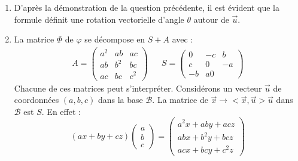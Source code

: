 \begin{enumerate}
\begin{multline*}
\overrightarrow u \wedge \overrightarrow x,
\overrightarrow u
\right) 
=
 \det
\left( 
\overrightarrow u \wedge \overrightarrow x,
\overrightarrow u,
(\overrightarrow u \wedge \overrightarrow x)\wedge \overrightarrow u
\right) \\
=
\left\Vert
(\overrightarrow u \wedge \overrightarrow x)\wedge \overrightarrow u
\right\Vert ^2
>0
\end{multline*}
On peut former une base orthonormée directe:
\begin{displaymath}
 \left( 
\dfrac{1}{\Vert \overrightarrow u \wedge \overrightarrow x\Vert}(\overrightarrow u \wedge \overrightarrow x)\wedge \overrightarrow u,
\dfrac{1}{\Vert \overrightarrow u \wedge \overrightarrow x\Vert} \overrightarrow u \wedge \overrightarrow x,
\overrightarrow u
\right) 
\end{displaymath}
\item D'après la démonstration de la question précédente, il est évident que la formule définit une rotation vectorielle d'angle $\theta$ autour de $\overrightarrow u$.
\item La matrice $\Phi$ de $\varphi$ se décompose en $S+A$ avec :
\begin{align*}
 A =
\begin{pmatrix}
a^2 & ab & ac \\
ab & b^2 & bc \\
ac & bc &c^2
 \end{pmatrix}
& &
S=
\begin{pmatrix}
0 & -c & b \\
c & 0 & -a \\
-b & a 0
\end{pmatrix}
\end{align*}
Chacune de ces matrices peut s'interpréter. Considérons un vecteur $\overrightarrow u$ de coordonnées $(a,b,c)$ dans la base $\mathcal B$.\newline
La matrice de $\overrightarrow x \rightarrow <\overrightarrow x , \overrightarrow u>\overrightarrow u$ dans $\mathcal B$ est $S$. En effet :
\begin{displaymath}
\left(ax+by+cz \right) 
 \begin{pmatrix}
  a \\ b \\ c
 \end{pmatrix}
=
\begin{pmatrix}
 a^2x+aby+acz \\
abx+b^2y+bcz \\
acx+bcy+c^2z
\end{pmatrix}

\end{displaymath}
\end{enumerate}
